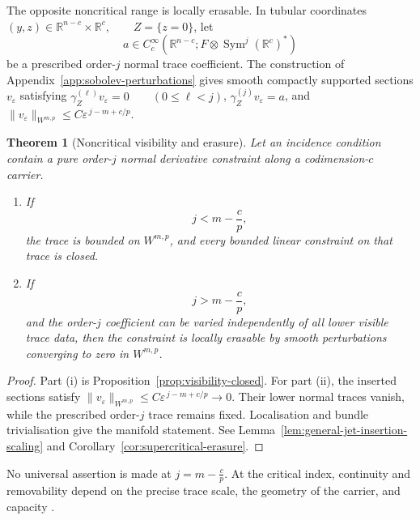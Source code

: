 \documentclass[11pt]{article}
\theoremstyle{plain}
\newtheorem{theorem}{Theorem}[section]
\theoremstyle{definition}
\begin{document}
The opposite noncritical range is locally erasable. In tubular
coordinates
\((y,z) \in \mathbb R^{n-c}\times\mathbb R^c, \qquad Z=\{z=0\}\),
let
\[
  a
  \in
  C_c^\infty
  \left(
    \mathbb R^{n-c};
    F\otimes
    \operatorname{Sym}^j(\mathbb R^c)^*
  \right)
\]
be a prescribed order-\(j\) normal trace coefficient. The construction
of Appendix~\ref{app:sobolev-perturbations} gives smooth compactly
supported sections \(v_\varepsilon\) satisfying
\(\gamma_Z^{(\ell)}v_\varepsilon=0 \qquad (0\leq\ell<j)\),
\(\gamma_Z^{(j)}v_\varepsilon=a\),
and
\(\|v_\varepsilon\|_{W^{m,p}} \leq C \varepsilon^{\,j-m+c/p}\).

\begin{theorem}[Noncritical visibility and erasure]
\label{thm:visibility-erasure}
Let an incidence condition contain a pure order-\(j\) normal derivative
constraint along a codimension-\(c\) carrier.

\begin{enumerate}[label=\textup{(\roman*)}]
  \item If
        \[
          j<m-\frac{c}{p},
        \]
        the trace is bounded on \(W^{m,p}\), and every bounded linear
        constraint on that trace is closed.

  \item If
        \[
          j>m-\frac{c}{p},
        \]
        and the order-\(j\) coefficient can be varied independently of
        all lower visible trace data, then the constraint is locally
        erasable by smooth perturbations converging to zero in
        \(W^{m,p}\).
\end{enumerate}
\end{theorem}

\begin{proof}
Part \textup{(i)} is
Proposition~\ref{prop:visibility-closed}.
For part \textup{(ii)}, the inserted sections satisfy
\(\|v_\varepsilon\|_{W^{m,p}} \leq C \varepsilon^{\,j-m+c/p} \longrightarrow0\).
Their lower normal traces vanish, while the prescribed order-\(j\)
trace remains fixed. Localisation and bundle trivialisation give the
manifold statement. See
Lemma~\ref{lem:general-jet-insertion-scaling}
and
Corollary~\ref{cor:supercritical-erasure}.
\end{proof}

No universal assertion is made at
\(j=m-\frac{c}{p}\).
At the critical index, continuity and removability depend on the
precise trace scale, the geometry of the carrier, and capacity
\citep{Mazya2011Sobolev,AdamsHedberg1996}.
\end{document}
